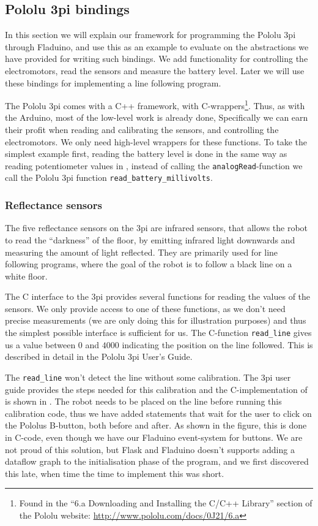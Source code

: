 \documentclass[a4paper, oneside, final]{memoir}
\let\fref\undefined
\let\Fref\undefined
\begin{document}
\subsection{Pololu 3pi bindings}
\label{sec:3pi bindings}
In this section we will explain our framework for programming the
Pololu 3pi through Fladuino, and use this as an example to evaluate on
the abstractions we have provided for writing such bindings. We add
functionality for controlling the electromotors, read the sensors and
measure the battery level. Later we will use these bindings for
implementing a line following program.

The Pololu 3pi comes with a C++ framework, with
C-wrappers\footnote{Found in the ``6.a Downloading and Installing the
  C/C++ Library'' section of the Pololu website:
  \url{http://www.pololu.com/docs/0J21/6.a}}. Thus, as with the
Arduino, most of the low-level work is already done, Specifically we
can earn their profit when reading and calibrating the sensors, and
controlling the electromotors. We only need high-level wrappers for
these functions.  To take the simplest example first, reading the
battery level is done in the same way as reading potentiometer values in
\fref[plain]{sec:potentiometer device}, instead of calling the
\verb|analogRead|-function we call the Pololu 3pi function
\verb|read_battery_millivolts|.

\subsubsection{Reflectance sensors}
The five reflectance sensors on the 3pi are infrared sensors, that
allows the robot to read the ``darkness'' of the floor, by emitting
infrared light downwards and measuring the amount of light
reflected. They are primarily used for line following programs, where
the goal of the robot is to follow a black line on a white floor.

The C interface to the 3pi provides several functions for reading the
values of the sensors. We only provide access to one of these
functions, as we don't need precise measurements (we are only doing
this for illustration purposes) and thus the simplest possible
interface is sufficient for us. The C-function \verb|read_line| gives us a
value between $0$ and $4000$ indicating the position on the line
followed. This is described in detail in the Pololu 3pi User's
Guide\cite{3pi_users_guide}.

The \verb|read_line| won't detect the line without some
calibration. The 3pi user guide provides the steps needed for this
calibration and the C-implementation of is shown in \Fref{fig:sensor
  calibration}. The robot needs to be placed on the line before
running this calibration code, thus we have added statements that wait
for the user to click on the Pololus B-button, both before and
after. As shown in the figure, this is done in C-code, even though we
have our Fladuino event-system for buttons. We are not proud of this
solution, but Flask and Fladuino doesn't supports adding a dataflow
graph to the initialisation phase of the program, and we first
discovered this late, when time the time to implement this was short.
\end{document}
